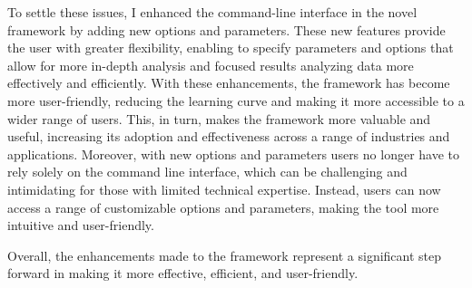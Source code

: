 \begin{description}
	\bigskip
	To settle these issues, I enhanced the command-line interface in the novel framework by adding new options and parameters. These new features provide the user with greater flexibility, enabling to specify parameters and options that allow for more in-depth analysis and focused results analyzing data more effectively and efficiently. With these enhancements, the framework has become more user-friendly, reducing the learning curve and making it more accessible to a wider range of users. \newline
	This, in turn, makes the framework more valuable and useful, increasing its adoption and effectiveness across a range of industries and applications. \newline
	Moreover, with new options and parameters users no longer have to rely solely on the command line interface, which can be challenging and intimidating for those with limited technical expertise. Instead, users can now access a range of customizable options and parameters, making the tool more intuitive and user-friendly. 
\end{description}
Overall, the enhancements made to the framework represent a significant step forward in making it more effective, efficient, and user-friendly.



%	
%	
%	

